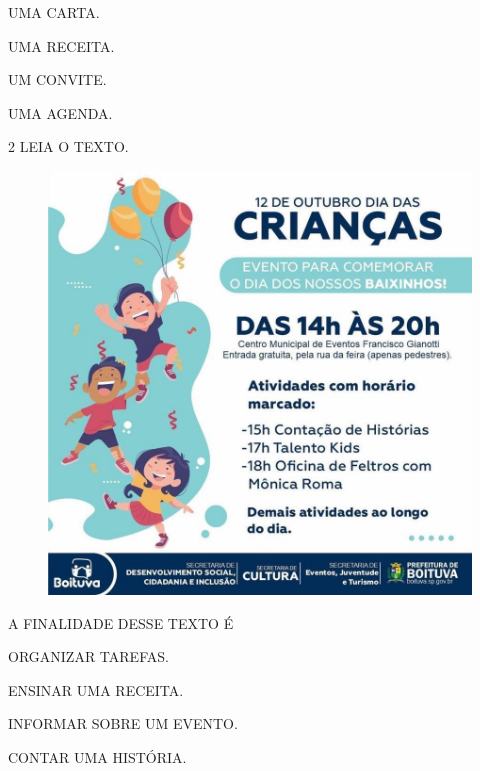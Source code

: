 \begin{escolha}[itemsep=0pt]
\item UMA CARTA.

\item UMA RECEITA.

\item UM CONVITE.

\item UMA AGENDA.
\end{escolha}

\num{2} LEIA O TEXTO.

\vspace{0.5cm}

\begin{figure}[H]
\centering
\includegraphics[width=\textwidth]{media/image158.jpg}
\end{figure}

A FINALIDADE DESSE TEXTO É

\begin{escolha}
\item ORGANIZAR TAREFAS.

\item ENSINAR UMA RECEITA.

\item INFORMAR SOBRE UM EVENTO.

\item CONTAR UMA HISTÓRIA.
\end{escolha}

